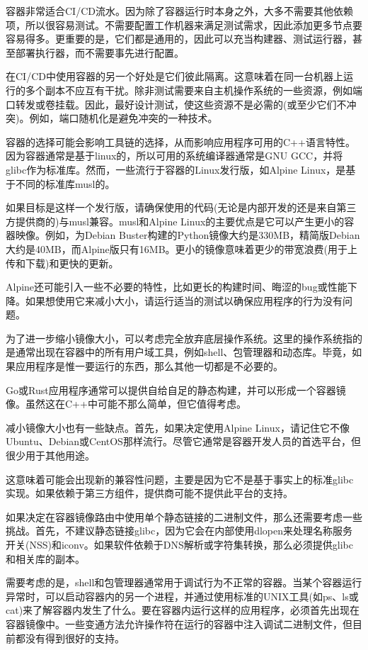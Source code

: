 
容器非常适合CI/CD流水。因为除了容器运行时本身之外，大多不需要其他依赖项，所以很容易测试。不需要配置工作机器来满足测试需求，因此添加更多节点要容易得多。更重要的是，它们都是通用的，因此可以充当构建器、测试运行器，甚至部署执行器，而不需要事先进行配置。

在CI/CD中使用容器的另一个好处是它们彼此隔离。这意味着在同一台机器上运行的多个副本不应互有干扰。除非测试需要来自主机操作系统的一些资源，例如端口转发或卷挂载。因此，最好设计测试，使这些资源不是必需的(或至少它们不冲突)。例如，端口随机化是避免冲突的一种技术。


容器的选择可能会影响工具链的选择，从而影响应用程序可用的C++语言特性。因为容器通常是基于linux的，所以可用的系统编译器通常是GNU GCC，并将glibc作为标准库。然而，一些流行于容器的Linux发行版，如Alpine Linux，是基于不同的标准库musl的。

如果目标是这样一个发行版，请确保使用的代码(无论是内部开发的还是来自第三方提供商的)与musl兼容。musl和Alpine Linux的主要优点是它可以产生更小的容器映像。例如，为Debian Buster构建的Python镜像大约是330MB，精简版Debian大约是40MB，而Alpine版只有16MB。更小的镜像意味着更少的带宽浪费(用于上传和下载)和更快的更新。

Alpine还可能引入一些不必要的特性，比如更长的构建时间、晦涩的bug或性能下降。如果想使用它来减小大小，请运行适当的测试以确保应用程序的行为没有问题。

为了进一步缩小镜像大小，可以考虑完全放弃底层操作系统。这里的操作系统指的是通常出现在容器中的所有用户域工具，例如shell、包管理器和动态库。毕竟，如果应用程序是惟一要运行的东西，那么其他一切都是不必要的。

Go或Rust应用程序通常可以提供自给自足的静态构建，并可以形成一个容器镜像。虽然这在C++中可能不那么简单，但它值得考虑。

减小镜像大小也有一些缺点。首先，如果决定使用Alpine Linux，请记住它不像Ubuntu、Debian或CentOS那样流行。尽管它通常是容器开发人员的首选平台，但很少用于其他用途。

这意味着可能会出现新的兼容性问题，主要是因为它不是基于事实上的标准glibc实现。如果依赖于第三方组件，提供商可能不提供此平台的支持。

如果决定在容器镜像路由中使用单个静态链接的二进制文件，那么还需要考虑一些挑战。首先，不建议静态链接glibc，因为它会在内部使用dlopen来处理名称服务开关(NSS)和iconv。如果软件依赖于DNS解析或字符集转换，那么必须提供glibc和相关库的副本。

需要考虑的是，shell和包管理器通常用于调试行为不正常的容器。当某个容器运行异常时，可以启动容器内的另一个进程，并通过使用标准的UNIX工具(如ps、ls或cat)来了解容器内发生了什么。要在容器内运行这样的应用程序，必须首先出现在容器镜像中。一些变通方法允许操作符在运行的容器中注入调试二进制文件，但目前都没有得到很好的支持。

